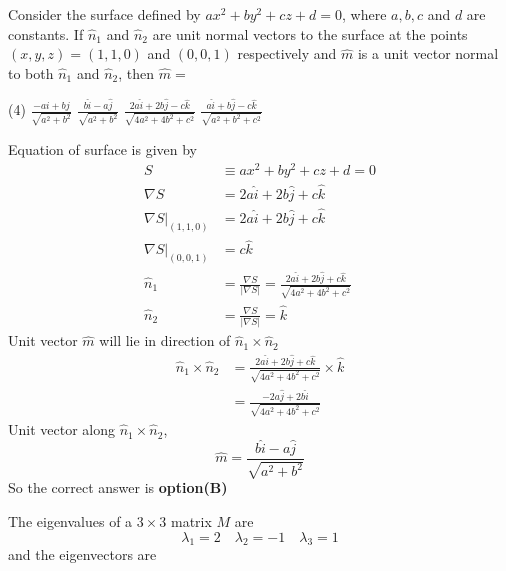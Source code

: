 \begin{questions}
\begin{minipage}{\textwidth}
	\question Consider the surface defined by $a x^{2}+b y^{2}+c z+d=0$, where $a, b, c$ and $d$ are constants. If $\hat{n}_{1}$ and $\hat{n}_{2}$ are unit normal vectors to the surface at the points $(x, y, z)=(1,1,0)$ and $(0,0,1)$ respectively and $\hat{m}$ is a unit vector normal to both $\hat{n}_{1}$ and $\hat{n}_{2}$, then $\hat{m}=$
\end{minipage}
\begin{tasks}(4)
	\task[\textbf{A.}] $\frac{-a i+b j}{\sqrt{a^{2}+b^{2}}}$
	\task[\textbf{B.}] $\frac{b \hat{i}-a \hat{j}}{\sqrt{a^{2}+b^{2}}}$
	\task[\textbf{C.}] $\frac{2 a \hat{i}+2 b \hat{j}-c \hat{k}}{\sqrt{4 a^{2}+4 b^{2}+c^{2}}}$
	\task[\textbf{D.}] $\frac{a \hat{i}+b \hat{j}-c \hat{k}}{\sqrt{a^{2}+b^{2}+c^{2}}}$
\end{tasks}
\begin{answer}
	Equation of surface is given by
	$$
	\begin{aligned}
	S & \equiv a x^{2}+b y^{2}+c z+d=0 \\
	\nabla S &=2 a \hat{i}+2 b \hat{j}+c \hat{k} \\
	\left.\nabla S\right|_{(1,1,0)} &=2 a \hat{i}+2 b \hat{j}+c \hat{k} \\
	\left.\nabla S\right|_{(0,0,1)} &=c \hat{k} \\
	\hat{n}_{1} &=\frac{\nabla S}{|\nabla S|}=\frac{2 a \hat{i}+2 b \hat{j}+c \hat{k}}{\sqrt{4 a^{2}+4 b^{2}+c^{2}}} \\
	\hat{n}_{2} &=\frac{\nabla S}{|\nabla S|}=\hat{k}
	\end{aligned}
	$$
	Unit vector $\hat{m}$ will lie in direction of $\hat{n}_{1} \times \hat{n}_{2}$
	$$
	\begin{aligned}
	\hat{n}_{1} \times \hat{n}_{2} &=\frac{2 a \hat{i}+2 b \hat{j}+c \hat{k}}{\sqrt{4 a^{2}+4 b^{2}+c^{2}}} \times \hat{k} \\
	&=\frac{-2 a \hat{j}+2 b \hat{i}}{\sqrt{4 a^{2}+4 b^{2}+c^{2}}}
	\end{aligned}
	$$
	Unit vector along $\hat{n}_{1} \times \hat{n}_{2}$,
	$$
	\hat{m}=\frac{b \hat{i}-a \hat{j}}{\sqrt{a^{2}+b^{2}}}
	$$
	So the correct answer is \textbf{option(B)}
\end{answer}
\begin{minipage}{\textwidth}
	\question The eigenvalues of a $3 \times 3$ matrix $M$ are
	$$
	\lambda_{1}=2 \quad \lambda_{2}=-1 \quad \lambda_{3}=1
	$$
	and the eigenvectors are

\end{minipage}
\end{questions}
